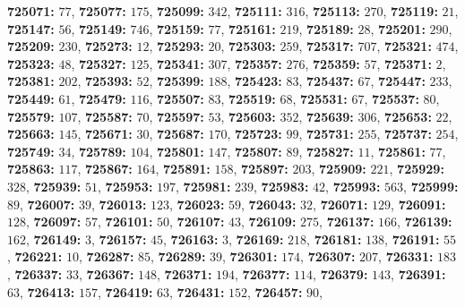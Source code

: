 \textsf{\bfseries 725071:} $77$, \textsf{\bfseries 725077:} $175$, \textsf{\bfseries 725099:} $342$, \textsf{\bfseries 725111:} $316$, \textsf{\bfseries 725113:} $270$, \textsf{\bfseries 725119:} $21$, \textsf{\bfseries 725147:} $56$, \textsf{\bfseries 725149:} $746$, \textsf{\bfseries 725159:} $77$, \textsf{\bfseries 725161:} $219$, \textsf{\bfseries 725189:} $28$, \textsf{\bfseries 725201:} $290$, \textsf{\bfseries 725209:} $230$, \textsf{\bfseries 725273:} $12$, \textsf{\bfseries 725293:} $20$, \textsf{\bfseries 725303:} $259$, \textsf{\bfseries 725317:} $707$, \textsf{\bfseries 725321:} $474$, \textsf{\bfseries 725323:} $48$, \textsf{\bfseries 725327:} $125$, \textsf{\bfseries 725341:} $307$, \textsf{\bfseries 725357:} $276$, \textsf{\bfseries 725359:} $57$, \textsf{\bfseries 725371:} $2$, \textsf{\bfseries 725381:} $202$, \textsf{\bfseries 725393:} $52$, \textsf{\bfseries 725399:} $188$, \textsf{\bfseries 725423:} $83$, \textsf{\bfseries 725437:} $67$, \textsf{\bfseries 725447:} $233$, \textsf{\bfseries 725449:} $61$, \textsf{\bfseries 725479:} $116$, \textsf{\bfseries 725507:} $83$, \textsf{\bfseries 725519:} $68$, \textsf{\bfseries 725531:} $67$, \textsf{\bfseries 725537:} $80$, \textsf{\bfseries 725579:} $107$, \textsf{\bfseries 725587:} $70$, \textsf{\bfseries 725597:} $53$, \textsf{\bfseries 725603:} $352$, \textsf{\bfseries 725639:} $306$, \textsf{\bfseries 725653:} $22$, \textsf{\bfseries 725663:} $145$, \textsf{\bfseries 725671:} $30$, \textsf{\bfseries 725687:} $170$, \textsf{\bfseries 725723:} $99$, \textsf{\bfseries 725731:} $255$, \textsf{\bfseries 725737:} $254$, \textsf{\bfseries 725749:} $34$, \textsf{\bfseries 725789:} $104$, \textsf{\bfseries 725801:} $147$, \textsf{\bfseries 725807:} $89$, \textsf{\bfseries 725827:} $11$, \textsf{\bfseries 725861:} $77$, \textsf{\bfseries 725863:} $117$, \textsf{\bfseries 725867:} $164$, \textsf{\bfseries 725891:} $158$, \textsf{\bfseries 725897:} $203$, \textsf{\bfseries 725909:} $221$, \textsf{\bfseries 725929:} $328$, \textsf{\bfseries 725939:} $51$, \textsf{\bfseries 725953:} $197$, \textsf{\bfseries 725981:} $239$, \textsf{\bfseries 725983:} $42$, \textsf{\bfseries 725993:} $563$, \textsf{\bfseries 725999:} $89$, \textsf{\bfseries 726007:} $39$, \textsf{\bfseries 726013:} $123$, \textsf{\bfseries 726023:} $59$, \textsf{\bfseries 726043:} $32$, \textsf{\bfseries 726071:} $129$, \textsf{\bfseries 726091:} $128$, \textsf{\bfseries 726097:} $57$, \textsf{\bfseries 726101:} $50$, \textsf{\bfseries 726107:} $43$, \textsf{\bfseries 726109:} $275$, \textsf{\bfseries 726137:} $166$, \textsf{\bfseries 726139:} $162$, \textsf{\bfseries 726149:} $3$, \textsf{\bfseries 726157:} $45$, \textsf{\bfseries 726163:} $3$, \textsf{\bfseries 726169:} $218$, \textsf{\bfseries 726181:} $138$, \textsf{\bfseries 726191:} $55$, \textsf{\bfseries 726221:} $10$, \textsf{\bfseries 726287:} $85$, \textsf{\bfseries 726289:} $39$, \textsf{\bfseries 726301:} $174$, \textsf{\bfseries 726307:} $207$, \textsf{\bfseries 726331:} $183$, \textsf{\bfseries 726337:} $33$, \textsf{\bfseries 726367:} $148$, \textsf{\bfseries 726371:} $194$, \textsf{\bfseries 726377:} $114$, \textsf{\bfseries 726379:} $143$, \textsf{\bfseries 726391:} $63$, \textsf{\bfseries 726413:} $157$, \textsf{\bfseries 726419:} $63$, \textsf{\bfseries 726431:} $152$, \textsf{\bfseries 726457:} $90$, 
